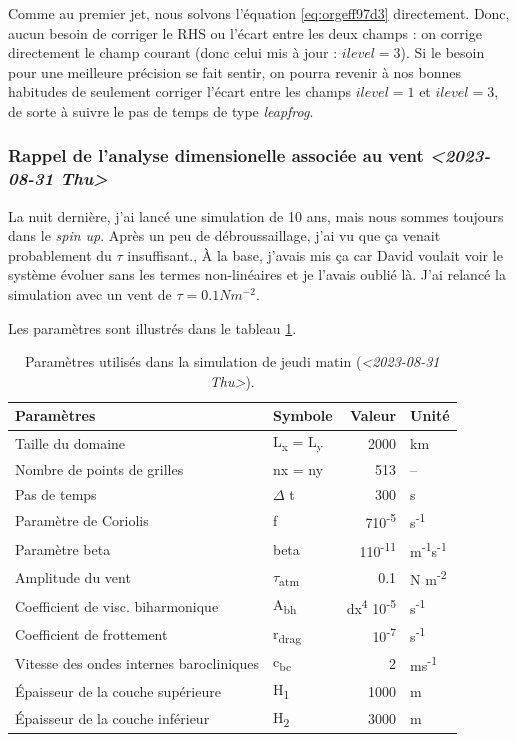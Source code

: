 \documentclass[10pt]{report}
\numberwithin{equation}{section}
\begin{document}
Comme au premier jet, nous solvons l'équation \ref{eq:orgeff97d3} directement.
Donc, aucun besoin de corriger le RHS ou l'écart entre les deux champs : on corrige directement le champ courant (donc celui mis à jour : \(ilevel=3\)).
Si le besoin pour une meilleure précision se fait sentir, on pourra revenir à nos bonnes habitudes de seulement corriger l'écart entre les champs \(ilevel=1\) et \(ilevel=3\), de sorte à suivre le pas de temps de type \emph{leapfrog}.

\subsubsection{Rappel de l'analyse dimensionelle associée au vent \textit{<2023-08-31 Thu>}}
\label{sec:org706c9cd}
La nuit dernière, j'ai lancé une simulation de 10 ans, mais nous sommes toujours dans le \emph{spin up}.
Après un peu de débroussaillage, j'ai vu que ça venait probablement du \(\tau\) insuffisant.,
À la base, j'avais mis ça car David voulait voir le système évoluer sans les termes non-linéaires et je l'avais oublié là.
J'ai relancé la simulation avec un vent de \(\tau = 0.1 Nm^{-2}\).\bigskip

Les paramètres sont illustrés dans le tableau \ref{tab:org1abcb90}.

\begin{table}[htbp]
\caption{\label{tab:org1abcb90}Paramètres utilisés dans la simulation de jeudi matin (\textit{<2023-08-31 Thu>}).}
\centering
\begin{tabular}{llrl}
\hline
\hline
Paramètres & Symbole & Valeur & Unité\\[0pt]
\hline
Taille du domaine & L\textsubscript{x} = L\textsubscript{y} & 2000 & km\\[0pt]
Nombre de points de grilles & nx = ny & 513 & --\\[0pt]
Pas de temps & \(\Delta\) t & 300 & s\\[0pt]
Paramètre de Coriolis & f & 7\texttimes{}10\textsuperscript{-5} & s\textsuperscript{-1}\\[0pt]
Paramètre beta & beta & 1\texttimes{}10\textsuperscript{-11} & m\textsuperscript{-1}s\textsuperscript{-1}\\[0pt]
Amplitude du vent & \(\tau\)\textsubscript{atm} & 0.1 & N m\textsuperscript{-2}\\[0pt]
Coefficient de visc. biharmonique & A\textsubscript{bh} & dx\textsuperscript{4} \texttimes{}10\textsuperscript{-5} & s\textsuperscript{-1}\\[0pt]
Coefficient de frottement & r\textsubscript{drag} & 10\textsuperscript{-7} & s\textsuperscript{-1}\\[0pt]
Vitesse des ondes internes barocliniques & c\textsubscript{bc} & 2 & ms\textsuperscript{-1}\\[0pt]
Épaisseur de la couche supérieure & H\textsubscript{1} & 1000 & m\\[0pt]
Épaisseur de la couche inférieur & H\textsubscript{2} & 3000 & m\\[0pt]
\hline
\end{tabular}
\end{table}
\end{document}

